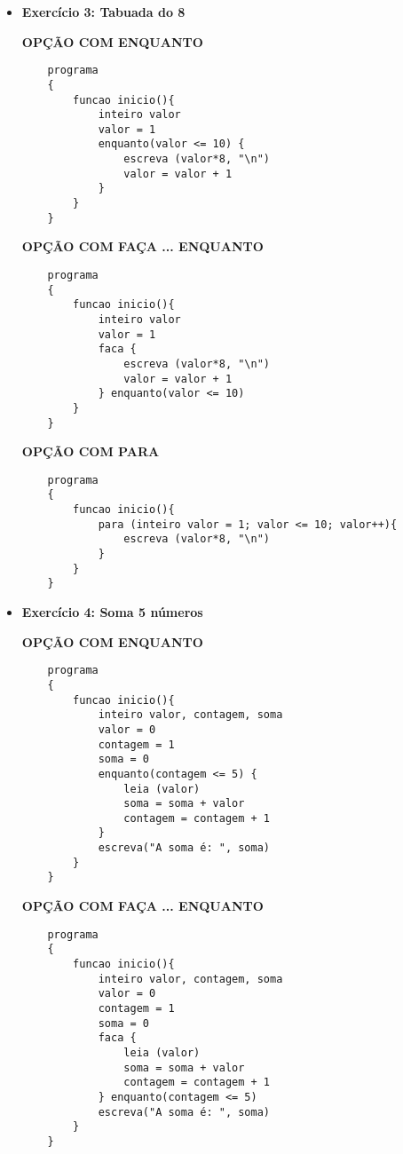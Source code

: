 \documentclass{article}
\begin{document}
\begin{itemize}
    \textbf{OPÇÃO COM PARA}
    \begin{lstlisting}
    programa
    {
        funcao inicio(){
            para (inteiro valor = 10; valor > 0; valor--){
                escreva (valor, "\n")
            }
        }
    }
    \end{lstlisting}

    \item \textbf{Exercício 3: Tabuada do 8}
    
    \textbf{OPÇÃO COM ENQUANTO}
    \begin{lstlisting}
    programa
    {
        funcao inicio(){
            inteiro valor
            valor = 1
            enquanto(valor <= 10) {
                escreva (valor*8, "\n")
                valor = valor + 1
            }
        }
    }
    \end{lstlisting}

    \textbf{OPÇÃO COM FAÇA ... ENQUANTO}
    \begin{lstlisting}
    programa
    {
        funcao inicio(){
            inteiro valor
            valor = 1
            faca {
                escreva (valor*8, "\n")
                valor = valor + 1
            } enquanto(valor <= 10)
        }
    }
    \end{lstlisting}

    \textbf{OPÇÃO COM PARA}
    \begin{lstlisting}
    programa
    {
        funcao inicio(){
            para (inteiro valor = 1; valor <= 10; valor++){
                escreva (valor*8, "\n")
            }
        }
    }
    \end{lstlisting}

    \item \textbf{Exercício 4: Soma 5 números}
    
    \textbf{OPÇÃO COM ENQUANTO}
    \begin{lstlisting}
    programa
    {
        funcao inicio(){
            inteiro valor, contagem, soma
            valor = 0
            contagem = 1
            soma = 0
            enquanto(contagem <= 5) {
                leia (valor)
                soma = soma + valor
                contagem = contagem + 1
            }
            escreva("A soma é: ", soma)
        }
    }
    \end{lstlisting}

    \textbf{OPÇÃO COM FAÇA ... ENQUANTO}
    \begin{lstlisting}
    programa
    {
        funcao inicio(){
            inteiro valor, contagem, soma
            valor = 0
            contagem = 1
            soma = 0
            faca {
                leia (valor)
                soma = soma + valor
                contagem = contagem + 1
            } enquanto(contagem <= 5)
            escreva("A soma é: ", soma)
        }
    }
    \end{lstlisting}


\end{itemize}
\end{document}

